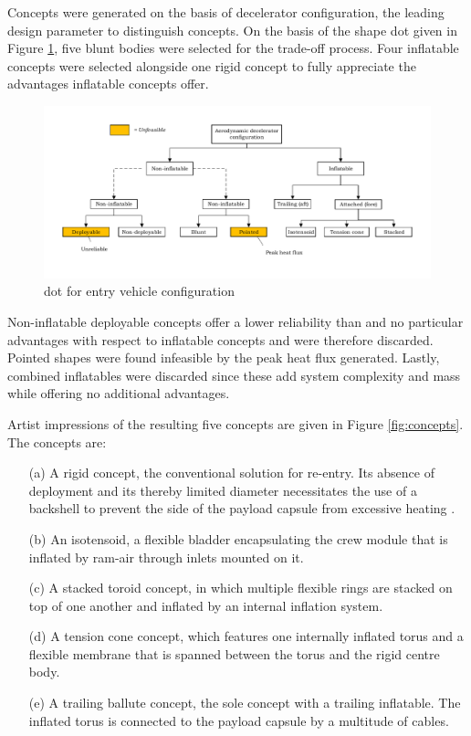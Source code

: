 Concepts were generated on the basis of decelerator configuration, the leading design parameter to distinguish concepts. On the basis of the shape \gls{dot} given in Figure \ref{fig:dotshape}, five blunt bodies were selected for the trade-off process. Four inflatable concepts were selected alongside one rigid concept to fully appreciate the advantages inflatable concepts offer.

\begin{figure}[h]
\hspace{-23mm}
\includegraphics[width = 1.25\textwidth]{Figure/Concepts/DOT_configuration.pdf}
\vspace{-5mm}
\caption{\acrlong{dot} for entry vehicle configuration}
\label{fig:dotshape}
\end{figure}

Non-inflatable deployable concepts offer a lower reliability than and no particular advantages with respect to inflatable concepts and were therefore discarded. Pointed shapes were found infeasible by the peak heat flux generated. Lastly, combined inflatables were discarded since these add system complexity and mass while offering no additional advantages. 

Artist impressions of the resulting five concepts are given in Figure \ref{fig:concepts}. The concepts are:
\begin{itemize}
\item[(a)] A rigid concept, the conventional solution for re-entry. Its absence of deployment and its thereby limited diameter necessitates the use of a backshell to prevent the side of the payload capsule from excessive heating \cite{Hughes2005}.
\item[(b)] An isotensoid, a flexible bladder encapsulating the crew module that is inflated by ram-air through inlets mounted on it.
\item[(c)] A stacked toroid concept, in which multiple flexible rings are stacked on top of one another and inflated by an internal inflation system.
\item[(d)] A tension cone concept, which features one internally inflated torus and a flexible membrane that is spanned between the torus and the rigid centre body.
\item[(e)] A trailing ballute concept, the sole concept with a trailing inflatable. The inflated torus is connected to the payload capsule by a multitude of cables.
\end{itemize}

